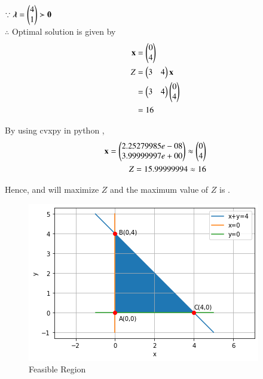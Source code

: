 \documentclass[journal,12pt,twocolumn]{IEEEtran}
\begin{document}
$\because \boldsymbol{\lambda}=\begin{pmatrix}4 \\ 1\end{pmatrix} \succ \mathbf{0} $
\\
$\therefore$ Optimal solution is given by
\begin{align}
    \mathbf{x} &= \begin{pmatrix}0\\4\end{pmatrix} \\
    Z &= \begin{pmatrix}3 & 4\end{pmatrix}\mathbf{x} \\
    &= \begin{pmatrix}3 & 4\end{pmatrix}\begin{pmatrix}0 \\ 4\end{pmatrix} \\
    &= 16
\end{align}

By using cvxpy in python ,
\begin{align}
    \mathbf{x}=\begin{pmatrix}2.25279985e-08\\3.99999997e+00\end{pmatrix} \approx \begin{pmatrix}0 \\ 4\end{pmatrix} \\
    Z = 15.99999994 \approx 16
\end{align}

Hence,  and  will maximize $Z$ and the maximum value of $Z$ is  .

\begin{figure}[!ht]
\centering
\includegraphics[width=\columnwidth]{Figure15}
\caption{Feasible Region}
\label{fig:Feasible Region}	
\end{figure}
\end{document}
